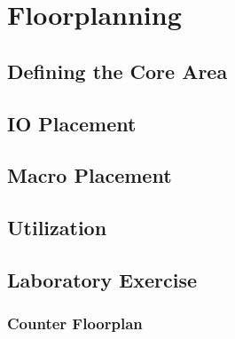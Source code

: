 \chapter{Floorplanning}

\section{Defining the Core Area}

\section{IO Placement}

\section{Macro Placement}

\section{Utilization}

\section{Laboratory Exercise}

\subsection*{Counter Floorplan}
